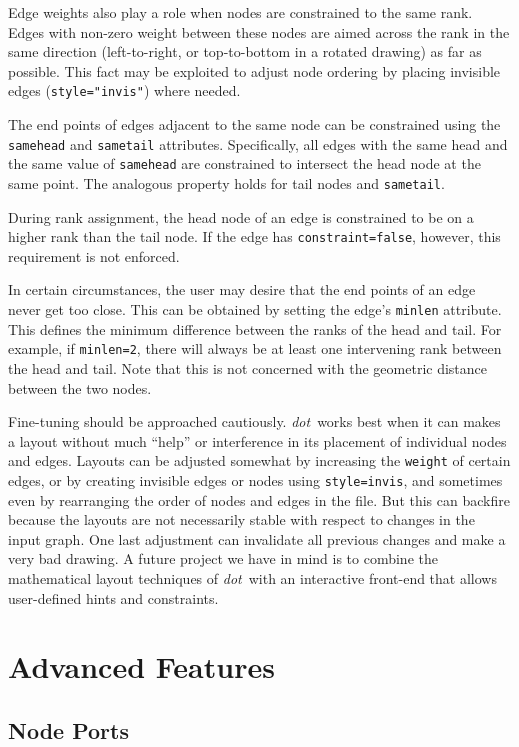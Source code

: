 \documentclass[11pt]{article}
\def\dot{{\it dot}}
\begin{document}
{Edge weights also play a role when nodes are constrained to the same rank. 
Edges with non-zero weight between these nodes
are aimed across the rank in the same direction
(left-to-right, or top-to-bottom in a rotated drawing) as far as possible.
This fact may be exploited to adjust node ordering by placing 
invisible edges (\verb'style="invis"') where needed.

The end points of edges adjacent to the same node can be constrained
using the {\tt samehead} and {\tt sametail} attributes. Specifically,
all edges with the same head and the same value of {\tt samehead}
are constrained to intersect the head node at the same point. The
analogous property holds for tail nodes and {\tt sametail}.

During rank assignment, the head node of an edge is constrained to be 
on a higher rank than the tail node. If the edge has {\tt constraint=false},
however, this requirement is not enforced.

In certain circumstances, the user may desire that the end points of
an edge never get too close. This can be obtained by setting the
edge's {\tt minlen} attribute. This defines the minimum difference
between the ranks of the head and tail. For example, if {\tt minlen=2},
there will always be at least one intervening rank between the head and tail.
Note that this is not concerned with the geometric distance between the
two nodes.

Fine-tuning should be approached cautiously.  \dot\ works
best when it can makes a layout without much ``help'' or
interference in its placement of individual nodes and edges.
Layouts can be adjusted somewhat by increasing the \verb"weight" of
certain edges, or by creating invisible edges or nodes using \verb"style=invis",
and sometimes even by rearranging the order of nodes and edges in the file.
But this can backfire because the layouts are 
not necessarily stable with respect to changes in the input graph.
One last adjustment can invalidate all previous changes and make
a very bad drawing.  A future project we have in mind is to combine
the mathematical layout techniques of \dot\ with an interactive 
front-end that allows user-defined hints and constraints.

\section{Advanced Features}

\subsection{Node Ports}
\label{sect:ports}

}
\end{document}
